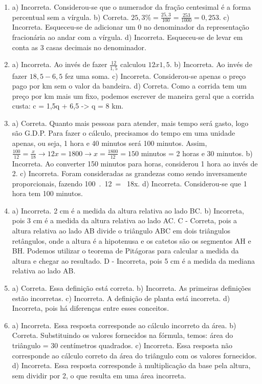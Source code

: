 \begin{enumerate}
\item a) Incorreta. Considerou-se que o numerador da fração centesimal é a forma percentual sem a vírgula.
b) Correta.
$25,3\% = \frac{25,3}{100} = \frac{253}{1000} = 0,253$.
c) Incorreta. Esqueceu-se de adicionar um 0 no denominador da representação fracionária ao andar com a vírgula.
d) Incorreta. Esqueceu-se de levar em conta as 3 casas decimais no denominador.


\item a) Incorreta. Ao invés de fazer $\frac{12}{1,5}$ calculou $12 x
1,5$. 
b) Incorreta. Ao invés de fazer $18,5 - 6,5$ fez uma soma. 
c) Incorreta. Considerou-se apenas o preço pago por km sem o valor da bandeira. 
d) Correta. Como a corrida tem um preço por km mais um
fixo, podemos escrever de maneira geral que a corrida custa:
c = 1,5q + 6,5 -> q = 8 km.


\item a) Correta. Quanto mais pessoas para atender, mais tempo será gasto, logo são G.D.P. Para fazer o cálculo, precisamos do tempo em uma
unidade apenas, ou seja, 1 hora e 40 minutos será 100 minutos. Assim, $\frac{100}{12} = \frac{x}{18} \rightarrow 12x = 1800 \rightarrow x = \frac{1800}{12} = 150$ minutos = 2 horas e 30 minutos. 
b) Incorreta. Ao converter 150 minutos para horas, considerou 1 hora ao invés de 2. 
c) Incorreta. Foram consideradas as grandezas como sendo inversamente proporcionais, fazendo 100\ .\ 12\  = \ 18x. 
d) Incorreta. Considerou-se que 1 hora tem 100 minutos.


\item a) Incorreta. 2 cm é a medida da altura relativa ao lado BC.
b) Incorreta, pois 3 cm é a medida da altura relativa ao lado AC.
C - Correta, pois a altura relativa ao lado AB divide o triângulo ABC em
dois triângulos retângulos, onde a altura é a hipotenusa e os catetos
são os segmentos AH e BH. Podemos utilizar o teorema de Pitágoras para
calcular a medida da altura e chegar ao resultado.
D - Incorreta, pois 5 cm é a medida da mediana relativa ao lado AB.

\item a) Correta. Essa definição está correta.
b) Incorreta. As primeiras definições estão incorretas.
c) Incorreta. A definição de planta está incorreta.
d) Incorreta, pois há diferenças entre esses conceitos.


\item a) Incorreta. Essa resposta corresponde ao cálculo incorreto da área.
b) Correta. Substituindo os valores fornecidos na fórmula, temos: área do triângulo = 30 centímetros quadrados.
c) Incorreta. Essa resposta não corresponde ao cálculo correto da área do triângulo com os valores fornecidos.
d) Incorreta. Essa resposta corresponde à multiplicação da base pela altura, sem dividir por 2, o que resulta em uma área incorreta.


\end{enumerate}
